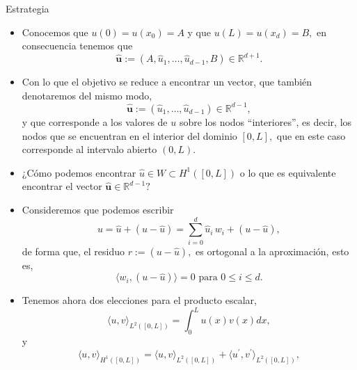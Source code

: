 \documentclass[10pt,handout]{beamer}
\theoremstyle{plain} %
\theoremstyle{plain} %
\theoremstyle{plain} %
\theoremstyle{plain} %
\theoremstyle{definition}
\theoremstyle{example}
\theoremstyle{example}
\theoremstyle{remark}
\theoremstyle{remark}
\begin{document}
\begin{frame}{Estrategia}
\begin{itemize}
\item Conocemos que $u(0)=u(x_0)=A$ y que $u(L)=u(x_d)=B,$ en consecuencia tenemos que
$$
\widehat{\mathbf{u}}:=(A,\widehat{u}_1,\ldots,\widehat{u}_{d-1},B) \in \mathbb{R}^{d+1}.
$$
\item Con lo que el objetivo se reduce a encontrar un vector, que también denotaremos del 
mismo modo,
$$
\widehat{\mathbf{u}}:=(\widehat{u}_1,\ldots,\widehat{u}_{d-1}) \in \mathbb{R}^{d-1},
$$
y que corresponde a los valores de $u$ sobre los nodos ``interiores'', es decir, los nodos que se encuentran en el interior del dominio $[0,L],$ que en este caso corresponde al intervalo abierto $(0,L).$ 
\end{itemize}
\end{frame}

\begin{frame}
\begin{itemize}
\item ¿Cómo podemos encontrar $\widehat{u} \in W \subset H^1([0,L])$ o lo que es equivalente encontrar
el vector $\widehat{\mathbf{u}}\in \mathbb{R}^{d-1}?$
\item Consideremos que podemos escribir
$$
u = \widehat{u} + (u-\widehat{u}) = \sum_{i=0}^d \widehat{u}_i \, w_i + (u-\widehat{u}),
$$
de forma que, el residuo $r:= (u-\widehat{u}),$ es ortogonal a la aproximación, esto es, 
$$
\langle w_i, (u-\widehat{u}) \rangle = 0 \text{ para } 0 \le i \le d. 
$$
\item Tenemos ahora dos elecciones para el producto escalar, 
$$
\langle u,v \rangle_{L^2([0,L])} = \int_0^L u(x)v(x) dx,
$$
y
$$
\langle u,v \rangle_{H^1([0,L])} = \langle u,v \rangle_{L^2([0,L])} + \langle u^{\prime},v^{\prime} \rangle_{L^2([0,L])},
$$
\end{itemize}
\end{frame}
\end{document}
